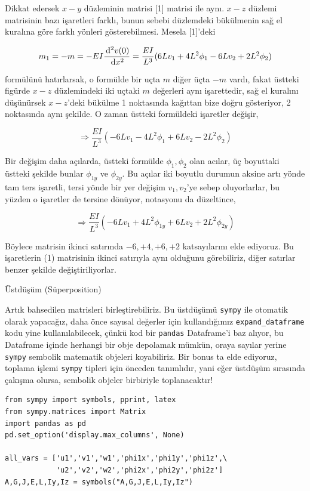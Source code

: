 \documentclass[12pt,fleqn]{article}\usepackage{../../common}
\begin{document}
Dikkat edersek $x-y$ düzleminin matrisi [1] matrisi ile aynı. $x-z$ düzlemi
matrisinin bazı işaretleri farklı, bunun sebebi düzlemdeki bükülmenin sağ el
kuralına göre farklı yönleri gösterebilmesi. Mesela [1]'deki 

$$
m_1 = -m = -EI \frac{\,\mathrm{d}^2 v(0)}{\,\mathrm{d} x^2} =
\frac{EI}{L^3} ( 6L v_1 + 4L^2 \phi_1 - 6L v_2 + 2 L^2 \phi_2 )
$$

formülünü hatırlarsak, o formülde bir uçta $m$ diğer üçta $-m$ vardı, fakat
üstteki figürde $x-z$ düzlemindeki iki uçtaki $m$ değerleri aynı işarettedir,
sağ el kuralını düşünürsek $x-z$'deki bükülme 1 noktasında kağıttan bize doğru
gösteriyor, 2 noktasında aynı şekilde. O zaman üstteki formüldeki işaretler
değişir,

$$
\Rightarrow \frac{EI}{L^3} ( -6L v_1 - 4L^2 \phi_1 + 6L v_2 - 2 L^2 \phi_2 )
$$

Bir değişim daha açılarda, üstteki formülde $\phi_1,\phi_2$ olan acılar,
üç boyuttaki üstteki şekilde bunlar $\phi_{1y}$ ve $\phi_{2y}$. Bu açılar
iki boyutlu durumun aksine artı yönde tam ters işaretli, tersi yönde bir
yer değişim $v_1,v_2$'ye sebep oluyorlarlar, bu yüzden o işaretler de
tersine dönüyor, notasyonu da düzeltince,

$$
\Rightarrow \frac{EI}{L^3} ( -6L v_1 + 4L^2 \phi_{1y} + 6L v_2 + 2 L^2 \phi_{2y} )
$$

Böylece matrisin ikinci satırında $-6,+4,+6,+2$ katsayılarını elde ediyoruz.
Bu işaretlerin (1) matrisinin ikinci satırıyla aynı olduğunu görebiliriz,
diğer satırlar benzer şekilde değiştiriliyorlar.

Üstdüşüm (Süperposition)

Artık bahsedilen matrisleri birleştirebiliriz. Bu üstdüşümü \verb!sympy!  ile
otomatik olarak yapacağız, daha önce sayısal değerler için kullandığımız
\verb!expand_dataframe! kodu yine kullanılabilecek, çünkü kod bir \verb!pandas!
Dataframe'i baz alıyor, bu Dataframe içinde herhangi bir obje depolamak mümkün,
oraya sayılar yerine \verb!sympy! sembolik matematik objeleri koyabiliriz. Bir
bonus ta elde ediyoruz, toplama işlemi \verb!sympy! tipleri için önceden
tanımlıdır, yani eğer üstdüşüm sırasında çakışma olursa, sembolik objeler
birbiriyle toplanacaktır!

\begin{verbatim}
from sympy import symbols, pprint, latex
from sympy.matrices import Matrix
import pandas as pd
pd.set_option('display.max_columns', None)

all_vars = ['u1','v1','w1','phi1x','phi1y','phi1z',\
            'u2','v2','w2','phi2x','phi2y','phi2z']
A,G,J,E,L,Iy,Iz = symbols("A,G,J,E,L,Iy,Iz")
\end{verbatim}
\end{document}
